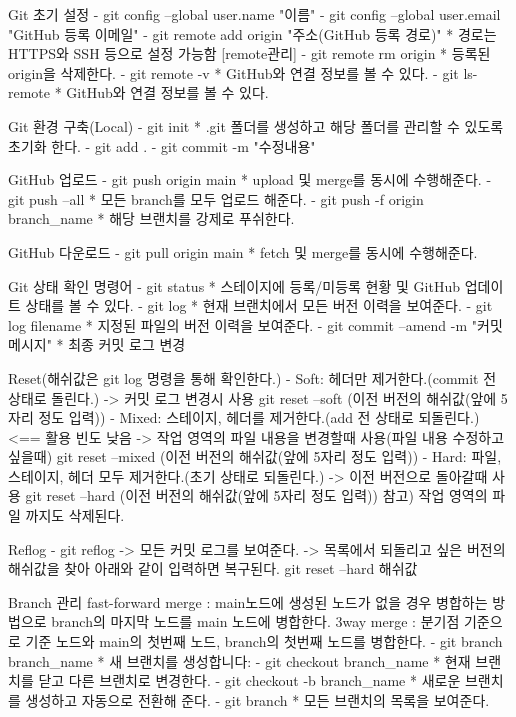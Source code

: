 
Git 초기 설정
  - git config --global user.name "이름"
  - git config --global user.email "GitHub 등록 이메일"
  - git remote add origin "주소(GitHub 등록 경로)"
    * 경로는 HTTPS와 SSH 등으로 설정 가능함
    [remote관리]
    - git remote rm origin
      * 등록된 origin을 삭제한다.
    - git remote -v 
      * GitHub와 연결 정보를 볼 수 있다.
    - git ls-remote
      * GitHub와 연결 정보를 볼 수 있다.

Git 환경 구축(Local)
  - git init 
    * .git 폴더를 생성하고 해당 폴더를 관리할 수 있도록 초기화 한다.
  - git add .
  - git commit -m "수정내용"

GitHub 업로드
  - git push origin main
    * upload 및 merge를 동시에 수행해준다.
  - git push --all
    * 모든 branch를 모두 업로드 해준다.
  - git push -f origin branch_name
    * 해당 브랜치를 강제로 푸쉬한다.
    
GitHub 다운로드
  - git pull origin main
    * fetch 및 merge를 동시에 수행해준다.

Git 상태 확인 명령어
  - git status
    * 스테이지에 등록/미등록 현황 및 GitHub 업데이트 상태를 볼 수 있다.
  - git log
    * 현재 브랜치에서 모든 버전 이력을 보여준다.
  - git log filename
    * 지정된 파일의 버전 이력을 보여준다.
  - git commit --amend -m "커밋 메시지"
    * 최종 커밋 로그 변경

Reset(해쉬값은 git log 명령을 통해 확인한다.)
  - Soft: 헤더만 제거한다.(commit 전 상태로 돌린다.)
    -> 커밋 로그 변경시 사용
    git reset --soft (이전 버전의 해쉬값(앞에 5자리 정도 입력))
  - Mixed: 스테이지, 헤더를 제거한다.(add 전 상태로 되돌린다.)   <== 활용 빈도 낮음
    -> 작업 영역의 파일 내용을 변경할때 사용(파일 내용 수정하고 싶을때)
    git reset --mixed (이전 버전의 해쉬값(앞에 5자리 정도 입력))
  - Hard: 파일, 스테이지, 헤더 모두 제거한다.(초기 상태로 되돌린다.)
    -> 이전 버전으로 돌아갈때 사용
    git reset --hard (이전 버전의 해쉬값(앞에 5자리 정도 입력))
    참고) 작업 영역의 파일 까지도 삭제된다.

Reflog
  - git reflog
    -> 모든 커밋 로그를 보여준다.
    -> 목록에서 되돌리고 싶은 버전의 해쉬값을 찾아 아래와 같이 입력하면 복구된다.
       git reset --hard 해쉬값

Branch 관리
fast-forward merge : main노드에 생성된 노드가 없을 경우 병합하는 방법으로 branch의 마지막 노드를 main 노드에 병합한다.
3way merge : 분기점 기준으로 기준 노드와 main의 첫번째 노드, branch의 첫번째 노드를 병합한다.
  - git branch branch_name
    * 새 브랜치를 생성합니다:
  - git checkout branch_name
    * 현재 브랜치를 닫고 다른 브랜치로 변경한다.
  - git checkout -b branch_name
    * 새로운 브랜치를 생성하고 자동으로 전환해 준다.
  - git branch
    * 모든 브랜치의 목록을 보여준다.

